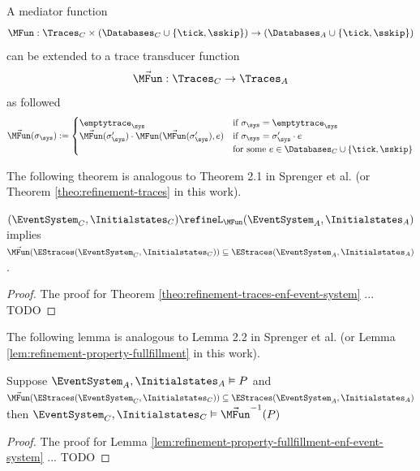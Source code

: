 \begin{definition}
    \label{def:mediator-function-trace-extension}
    A mediator function
    $$\MFun : \Traces_C \times (\Databases_C \cup \{ \tick, \sskip \})
    \to (\Databases_A \cup \{ \tick, \sskip \})$$
    can be extended to a trace transducer function
    $$\vec{\MFun} : \Traces_C \to \Traces_A$$
    as followed
    \begin{align*}
        \vec{\MFun}(\sigma_\sys) :=
        \begin{cases}
            \emptytrace_\sys &\text{if } \sigma_\sys = \emptytrace_\sys \\
            \vec{\MFun}(\sigma_\sys') \cdot \MFun(\vec{\MFun}(\sigma_\sys'), e)
                &\text{if } \sigma_\sys = \sigma_\sys' \cdot e \\
                &\text{for some } e \in \Databases_C \cup \{\tick, \sskip \}
        \end{cases}
    \end{align*}
\end{definition}

The following theorem is analogous to Theorem 2.1 in Sprenger et al. \cite{igloo}
(or Theorem \ref{theo:refinement-traces} in this work).
\begin{theorem}
    \label{theo:refinement-traces-enf-event-system}
    $(\EventSystem_C, \Initialstates_C) \refineL_\MFun (\EventSystem_A, \Initialstates_A)$
    implies
    $\vec{\MFun}(\EStraces(\EventSystem_C, \Initialstates_C)) \subseteq
    \EStraces(\EventSystem_A, \Initialstates_A)$.
\end{theorem}
\begin{proof}
    The proof for Theorem \ref{theo:refinement-traces-enf-event-system} ... TODO
\end{proof}

The following lemma is analogous to Lemma 2.2 in Sprenger et al. \cite{igloo}
(or Lemma \ref{lem:refinement-property-fullfillment} in this work).
\begin{lemma}
    \label{lem:refinement-property-fullfillment-enf-event-system}
    Suppose 
    $\EventSystem_A, \Initialstates_A \vDash P$
    and
    $\vec{\MFun}(\EStraces(\EventSystem_C, \Initialstates_C)) \subseteq
    \EStraces(\EventSystem_A, \Initialstates_A)$
    then
    $\EventSystem_C, \Initialstates_C \vDash \vec{\MFun}^{-1}(P)$
\end{lemma}
\begin{proof}
    The proof for Lemma \ref{lem:refinement-property-fullfillment-enf-event-system} ... TODO
\end{proof}


